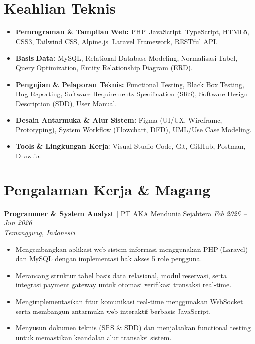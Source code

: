 \documentclass[letterpaper,10pt]{article}
\begin{document}
\section{Keahlian Teknis}

\begin{itemize}
  \item \textbf{Pemrograman \& Tampilan Web:} PHP, JavaScript, TypeScript, HTML5, CSS3, Tailwind CSS, Alpine.js, Laravel Framework, RESTful API.
  \item \textbf{Basis Data:} MySQL, Relational Database Modeling, Normalisasi Tabel, Query Optimization, Entity Relationship Diagram (ERD).
  \item \textbf{Pengujian \& Pelaporan Teknis:} Functional Testing, Black Box Testing, Bug Reporting, Software Requirements Specification (SRS), Software Design Description (SDD), User Manual.
  \item \textbf{Desain Antarmuka \& Alur Sistem:} Figma (UI/UX, Wireframe, Prototyping), System Workflow (Flowchart, DFD), UML/Use Case Modeling.
  \item \textbf{Tools \& Lingkungan Kerja:} Visual Studio Code, Git, GitHub, Postman, Draw.io.
\end{itemize}

\section{Pengalaman Kerja \& Magang}

\noindent
\textbf{Programmer \& System Analyst} \textbf{|} PT AKA Mendunia Sejahtera \hfill \textit{Feb 2026 -- Jun 2026} \\
\textit{Temanggung, Indonesia}
\begin{itemize}
  \item Mengembangkan aplikasi web sistem informasi menggunakan PHP (Laravel) dan MySQL dengan implementasi hak akses 5 role pengguna.
  \item Merancang struktur tabel basis data relasional, modul reservasi, serta integrasi payment gateway untuk otomasi verifikasi transaksi real-time.
  \item Mengimplementasikan fitur komunikasi real-time menggunakan WebSocket serta membangun antarmuka web interaktif berbasis JavaScript.
  \item Menyusun dokumen teknis (SRS \& SDD) dan menjalankan functional testing untuk memastikan keandalan alur transaksi sistem.
\end{itemize}
\end{document}
